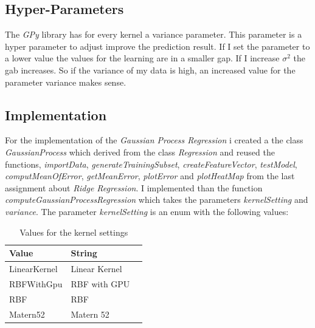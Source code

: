 \documentclass[10pt, a4paper, twocolumn]{article} %
\begin{document}
\subsection{Hyper-Parameters}
The \textit{GPy} library has for every kernel a variance parameter. This parameter is a hyper parameter to adjust improve the prediction result. If I set the parameter to a lower value the values for the learning are in a smaller gap. If I increase $\sigma^2$ the gab increases. So if the variance of my data is high, an increased value for the parameter variance makes sense.

\subsection{Implementation}
For the implementation of the \textit{Gaussian Process Regression} i created a the class \textit{GaussianProcess} which derived from the class \textit{Regression} and reused the functions, \textit{importData}, \textit{generateTrainingSubset}, \textit{createFeatureVector}, \textit{testModel}, \textit{computMeanOfError}, \textit{getMeanError}, \textit{plotError} and \textit{plotHeatMap} from the last assignment about \textit{Ridge Regression}. I implemented than the function \textit{computeGaussianProcessRegression} which takes the parameters \textit{kernelSetting} and \textit{variance}. The parameter \textit{kernelSetting} is an enum with the following values: 
\begin{table}[htbp]
    \label{tab:kernelSettings}
	\caption{Values for the kernel settings}
	\centering
	\begin{tabular}{llr}
		\cmidrule(r){1-2}
		Value & String \\
		\midrule
		LinearKernel & Linear Kernel \\
		RBFWithGpu & RBF with GPU \\
		RBF & RBF \\				
		Matern52 & Matern 52 \\
		\bottomrule
	\end{tabular}
\end{table}
\end{document}
